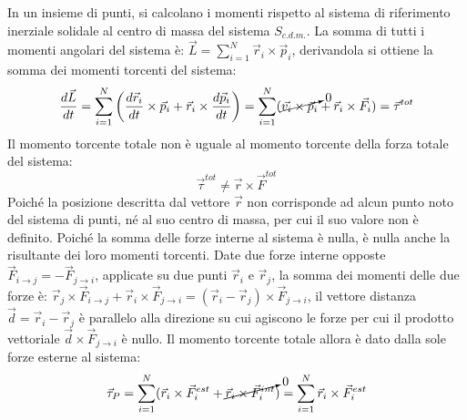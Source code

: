 \documentclass{article}
\numberwithin{equation}{subsection}
\begin{document}
In un insieme di punti, si calcolano i momenti rispetto 
al sistema di riferimento inerziale solidale al centro 
di massa del sistema $S_{c.d.m.}$. La somma 
di tutti i momenti angolari del sistema è: $\vec{L}=\displaystyle\sum_{i=1}^{N}\vec{r}_i\times\vec{p}_i$, 
derivandola si ottiene la somma dei momenti torcenti 
del sistema: 
\begin{equation}
    \displaystyle\frac{d\vec{L}}{dt}=\sum_{i=1}^{N}\left(\frac{d\vec{r}_i}{dt}\times\vec{p}_i+\vec{r}_i\times\frac{d\vec{p}_i}{dt}\right)=\sum_{i=1}^{N}(\cancelto{0}{\vec{v_i}\times\vec{p}_i}+\vec{r}_i\times\vec{F}_i)=\vec{\tau}^{tot}
\end{equation}
Il momento torcente totale non è uguale al momento torcente 
della forza totale del sistema: 
\begin{equation}
    \vec{\tau}^{tot}\neq\vec{r}\times\vec{F}^{tot}
\end{equation}
Poiché la posizione descritta dal vettore $\vec{r}$ non corrisponde ad alcun punto noto del sistema di punti, né al suo centro di massa, per cui il suo valore non è definito. 
Poiché la somma delle forze interne al sistema è nulla, è nulla anche la risultante dei loro momenti torcenti. Date due forze interne opposte 
$\vec{F}_{i\to j}=-\vec{F}_{j\to i}$, applicate su due punti 
$\vec{r}_i$ e $\vec{r}_j$, la somma dei momenti delle due forze 
è: $\vec{r}_j\times\vec{F}_{i\to j}+\vec{r}_i\times\vec{F}_{j\to i}=(\vec r_i-\vec r_j)\times\vec{F}_{j\to i}$, 
il vettore distanza $\vec{d}=\vec{r}_i-\vec{r}_j$ è parallelo 
alla direzione su cui agiscono le forze per cui il prodotto 
vettoriale $\vec{d}\times\vec{F}_{j\to i}$ è nullo. 
Il momento torcente totale allora è dato dalla sole forze esterne al sistema:
\begin{equation}
    \vec{\tau}_P=\displaystyle\sum_{i=1}^{N}(\vec{r}_i\times\vec{F}^{est}_i+\cancelto{0}{\vec{r}_i\times\vec{F}^{int}_i})=\sum_{i=1}^{N}\vec{r}_i\times\vec{F}^{est}_i
\end{equation}
\begin{center}\end{center}
\end{document}
